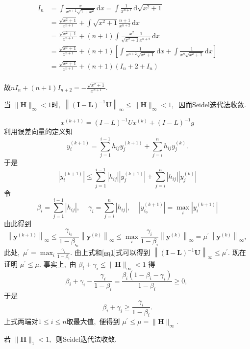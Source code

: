 	\begin{solution}
		$$\begin{aligned}
			I_n&=\int \frac{x}{x^{n+1}\sqrt{1+x^2}}\,\text{d}x=\int\frac{1}{x^{n+1}}\,\text{d}\sqrt{x^2+1}\\
			&=\frac{\sqrt{x^2+1}}{x^{n+1}}+\int\sqrt{x^2+1}\frac{n+1}{x^{n+2}}\,\text{d}x\\
			&=\frac{\sqrt{x^2+1}}{x^{n+1}}+(n+1)\int\frac{x^2+1}{\sqrt{x^2+1}x^{n+2}}\,\text{d}x\\
			&=\frac{\sqrt{x^2+1}}{x^{n+1}}+(n+1)\left[\int\frac{1}{x^{n+2}\sqrt{x^2+1}}\,\text{d}x+\int\frac{1}{x^n\sqrt{x^2+1}}\,\text{d}x\right]\\
			&=\frac{\sqrt{x^2+1}}{x^{n+1}}+(n+1)\left(I_n+2+I_n\right)\\
		\end{aligned}
		$$
		
		故$nI_n+(n+1)I_{n+2}=-\frac{\sqrt{x^2+1}}{x^{n+1}}.$
	\end{solution}
	
	\newpage
	\begin{problem}
		当  $\|\boldsymbol{H}\|_{\infty}<1  $时,\   $\left\|(\boldsymbol{I}-\boldsymbol{L})^{-1} \boldsymbol{U}\right\|_{\infty} \leqslant\|\boldsymbol{H}\|_{\infty}<1 ,\ $ 因而$\mathrm{Seidel}$迭代法收敛.
	\end{problem}
	
	\begin{solution}
		\begin{equation}
			x^{(k+1)}=(I-L)^{-1}Ux^{(k)}+(I-L)^{-1}g\label{eq1}
		\end{equation}
		利用误差向量的定义知
		$$y_{i}^{(k+1)}=\sum_{j=1}^{i-1} h_{i j} y_{j}^{(k+1)}+\sum_{j=i}^{n} h_{i j} y_{j}^{(k)} .$$
		于是
		$$\left|y_{i}^{(k+1)}\right| \leqslant \sum_{j=1}^{i-1}\left|h_{i j}\right|\left|y_{j}^{(k+1)}\right|+\sum_{j=i}^{n}\left|h_{i j}\right|\left|y_{j}^{(k)}\right|$$
		令
		$$\beta_{i}=\sum_{j=1}^{i-1}\left|h_{i j}\right|,\  \quad \gamma_{i}=\sum_{j=i}^{n}\left|h_{i j}\right|,\  \quad\left|y_{i_{0}}^{(k+1)}\right|=\max _{i}\left|y_{i}^{(k+1)}\right|$$
		由此得到
		$$\left\|\boldsymbol{y}^{(k+1)}\right\|_{\infty} \leqslant \frac{\gamma_{i_{0}}}{1-\beta_{i_{0}}}\left\|\boldsymbol{y}^{(k)}\right\|_{\infty} \leqslant \max _{i} \frac{\gamma_{i}}{1-\beta_{i}}\left\|\boldsymbol{y}^{(k)}\right\|_{\infty}=\mu^{\prime}\left\|\boldsymbol{y}^{(k)}\right\|_{\infty},\ $$
		此处,\   $\mu^{\prime}=\max _{i} \frac{\gamma_{i}}{1-\beta_{i}} .$ 由上式和\eqref{eq1}式可以得到 $ \left\|(\boldsymbol{I}-\boldsymbol{L})^{-1} \boldsymbol{U}\right\|_{\infty} \leqslant \mu^{\prime} .$ 现在证明  $\mu^{\prime} \leqslant \mu .$ 事实上,\  由  $\beta_{i}+\gamma_{i} \leqslant\|\boldsymbol{H}\|_{\infty}<1 $ 得
		$$\beta_{i}+\gamma_{i}-\frac{\gamma_{i}}{1-\beta_{i}}=\frac{\beta_{i}\left(1-\beta_{i}-\gamma_{i}\right)}{1-\beta_{i}} \geqslant 0,\ $$
		于是
		$$\beta_{i}+\gamma_{i} \geqslant \frac{\gamma_{i}}{1-\beta_{i}} .$$
		上式两端对$  1 \leqslant i \leqslant n  $取最大值,\  便得到  $\mu^{\prime} \leqslant \mu=\|\boldsymbol{H}\|_{\infty} .$
	\end{solution}
	\newpage
	\begin{problem}
		若  $\|\boldsymbol{H}\|_{1}<1 ,\ $ 则$\mathrm{Seidel}$迭代法收敛.
	\end{problem}
	
